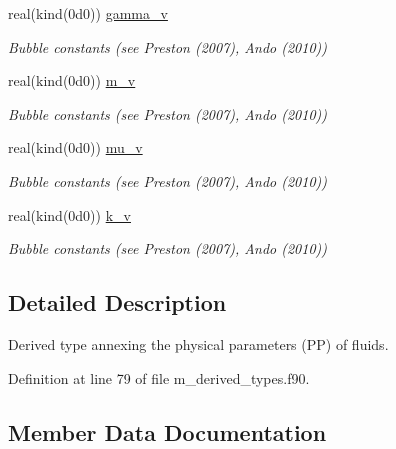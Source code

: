 \begin{DoxyCompactItemize}
real(kind(0d0)) \hyperlink{structm__derived__types_1_1physical__parameters_abd23a0dbe438123007b1d7d19df3c648}{gamma\+\_\+v}
\begin{DoxyCompactList}\small\item\em Bubble constants (see Preston (2007), Ando (2010)) \end{DoxyCompactList}\item 
real(kind(0d0)) \hyperlink{structm__derived__types_1_1physical__parameters_a746535809605882bd17638e8c5b091da}{m\+\_\+v}
\begin{DoxyCompactList}\small\item\em Bubble constants (see Preston (2007), Ando (2010)) \end{DoxyCompactList}\item 
real(kind(0d0)) \hyperlink{structm__derived__types_1_1physical__parameters_ae4f670160d4e4effb657407407fd33e8}{mu\+\_\+v}
\begin{DoxyCompactList}\small\item\em Bubble constants (see Preston (2007), Ando (2010)) \end{DoxyCompactList}\item 
real(kind(0d0)) \hyperlink{structm__derived__types_1_1physical__parameters_a4d91aba9648caf359524976932f83de6}{k\+\_\+v}
\begin{DoxyCompactList}\small\item\em Bubble constants (see Preston (2007), Ando (2010)) \end{DoxyCompactList}\end{DoxyCompactItemize}


\subsection{Detailed Description}
Derived type annexing the physical parameters (PP) of fluids. 

Definition at line 79 of file m\+\_\+derived\+\_\+types.\+f90.



\subsection{Member Data Documentation}
\mbox{\label{structm__derived__types_1_1physical__parameters_a767cbe0b3d10bf2fa0ab2e3372881413}} 
